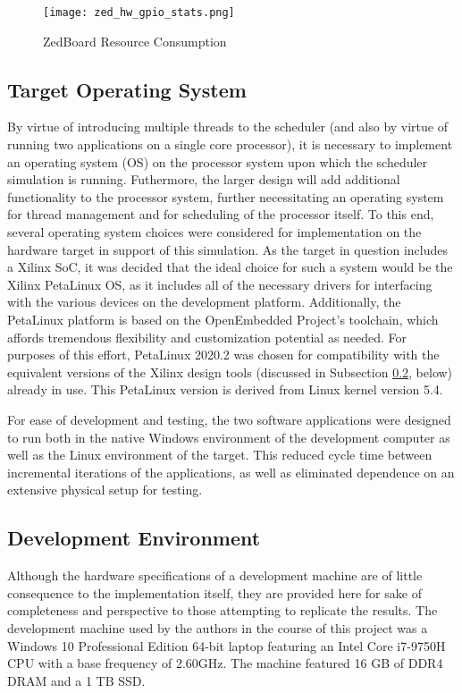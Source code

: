 
\begin{figure}
    \centering
    \texttt{[image: zed\_hw\_gpio\_stats.png]}
    \caption[ZedBoard Resource Consumption]{ZedBoard Resource Consumption}
    \label{fig:zedResourceConsumption}
\end{figure}

\subsection{Target Operating System}\label{subsec:os}
By virtue of introducing multiple threads to the scheduler (and also by virtue of running two applications on a single core processor), it is necessary to implement an operating system (OS) on the processor system upon which the scheduler simulation is running. Futhermore, the larger design will add additional functionality to the processor system, further necessitating an operating system for thread management and for scheduling of the processor itself. To this end, several operating system choices were considered for implementation on the hardware target in support of this simulation. As the target in question includes a Xilinx SoC, it was decided that the ideal choice for such a system would be the Xilinx PetaLinux OS, as it includes all of the necessary drivers for interfacing with the various devices on the development platform. Additionally, the PetaLinux platform is based on the OpenEmbedded Project's toolchain, which affords tremendous flexibility and customization potential as needed. For purposes of this effort, PetaLinux 2020.2 was chosen for compatibility with the equivalent versions of the Xilinx design tools (discussed in Subsection \ref{subsec:devEnv}, below) already in use. This PetaLinux version is derived from Linux kernel version 5.4.

For ease of development and testing, the two software applications were designed to run both in the native Windows environment of the development computer as well as the Linux environment of the target. This reduced cycle time between incremental iterations of the applications, as well as eliminated dependence on an extensive physical setup for testing.

\subsection{Development Environment}\label{subsec:devEnv}
Although the hardware specifications of a development machine are of little consequence to the implementation itself, they are provided here for sake of completeness and perspective to those attempting to replicate the results. The development machine used by the authors in the course of this project was a Windows 10 Professional Edition 64-bit laptop featuring an Intel Core i7-9750H CPU with a base frequency of 2.60GHz. The machine featured 16 GB of DDR4 DRAM and a 1 TB SSD.

